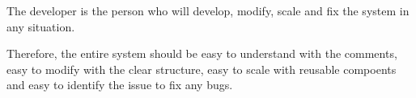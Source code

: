 The developer is the person who will develop, modify, scale and fix the system in any situation.

Therefore, the entire system should be easy to understand with the comments, 
easy to modify with the clear structure, easy to scale with reusable compoents 
and easy to identify the issue to fix any bugs.